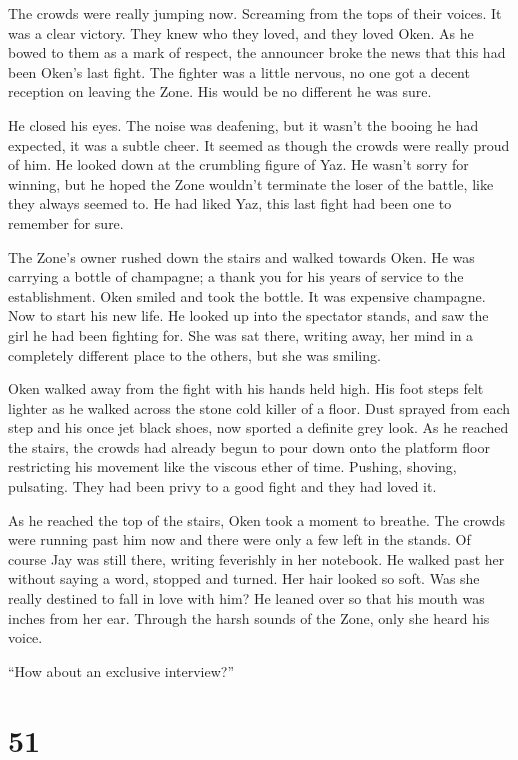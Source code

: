 The crowds were really jumping now.  Screaming from the tops of their voices.  It was a clear victory.  They knew who they loved, and they loved Oken.  As he bowed to them as a mark of respect, the announcer broke the news that this had been Oken's last fight.  The fighter was a little nervous, no one got a decent reception on leaving the Zone.  His would be no different he was sure.

He closed his eyes.  The noise was deafening, but it wasn't the booing he had expected, it was a subtle cheer.  It seemed as though the crowds were really proud of him.  He looked down at the crumbling figure of Yaz.  He wasn't sorry for winning, but he hoped the Zone wouldn't terminate the loser of the battle, like they always seemed to.  He had liked Yaz, this last fight had been one to remember for sure.  

The Zone's owner rushed down the stairs and walked towards Oken.  He was carrying a bottle of champagne; a thank you for his years of service to the establishment.  Oken smiled and took the bottle.  It was expensive champagne.  Now to start his new life.  He looked up into the spectator stands, and saw the girl he had been fighting for.  She was sat there, writing away, her mind in a completely different place to the others, but she was smiling.

Oken walked away from the fight with his hands held high.  His foot steps felt lighter as he walked across the stone cold killer of a floor.  Dust sprayed from each step and his once jet black shoes, now sported a definite grey look.  As he reached the stairs, the crowds had already begun to pour down onto the platform floor restricting his movement like the viscous ether of time.  Pushing, shoving, pulsating.  They had been privy to a good fight and they had loved it.

As he reached the top of the stairs, Oken took a moment to breathe.  The crowds were running past him now and there were only a few left in the stands.  Of course Jay was still there, writing feverishly in her notebook.  He walked past her without saying a word, stopped and turned.  Her hair looked so soft.  Was she really destined to fall in love with him?  He leaned over so that his mouth was inches from her ear.  Through the harsh sounds of the Zone, only she heard his voice.

``How about an exclusive interview?''





\chapter{51}
